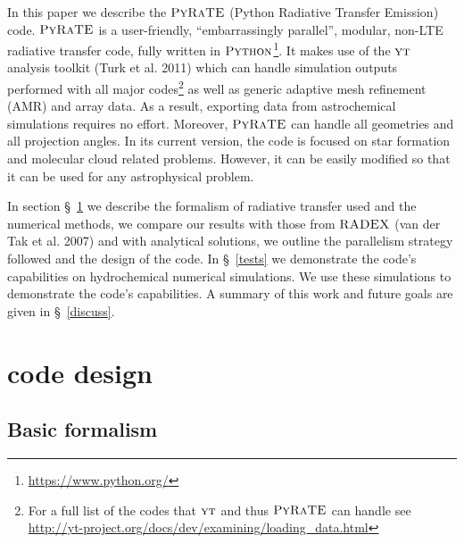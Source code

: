 \documentclass{mn2e}
\begin{document}
In this paper we describe the $\textsc{PyRaTE}$ (Python Radiative Transfer Emission) code. $\textsc{PyRaTE}$ is a user-friendly, ``embarrassingly parallel'', modular, non-LTE radiative transfer code, fully written in $\textsc{Python}$\footnote{\url{https://www.python.org/}}. It makes use of the $\textsc{yt}$ analysis toolkit (Turk et al. 2011) which can handle simulation outputs performed with all major codes\footnote{For a full list of the codes that $\textsc{yt}$ and thus $\textsc{PyRaTE}$ can handle see \url{http://yt-project.org/docs/dev/examining/loading_data.html}} as well as generic adaptive mesh refinement (AMR) and array data. As a result, exporting data from astrochemical simulations requires no effort. Moreover, $\textsc{PyRaTE}$ can handle all geometries and all projection angles. In its current version, the code is focused on star formation and molecular cloud related problems. However, it can be easily modified so that it can be used for any astrophysical problem. 


In section \S~\ref{code} we describe the formalism of radiative transfer used and the numerical methods, we compare our results with those from $\textsc{RADEX}$ (van der Tak et al. 2007) and with analytical solutions, we outline the parallelism strategy followed and the design of the code. In \S~\ref{tests} we demonstrate the code's capabilities on hydrochemical numerical simulations. We use these simulations to demonstrate the code's capabilities. A summary of this work and future goals are given in \S~\ref{discuss}.


\section{code design}\label{code}
\subsection{Basic formalism}
\end{document}
